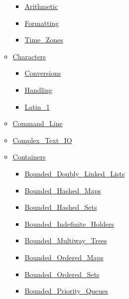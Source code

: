 \begin{scriptsize}
\begin{multicols*}{\columnnr}
\begin{itemize}[leftmargin=0mm]
\begin{itemize}[leftmargin=5mm]
	\begin{itemize}[leftmargin=5mm]
	\item[] \href{http://www.ada-auth.org/standards/22rm/html/RM-9-6-1.html}{Arithmetic}
	\item[] \href{http://www.ada-auth.org/standards/22rm/html/RM-9-6-1.html}{Formatting}
	\item[] \href{http://www.ada-auth.org/standards/22rm/html/RM-9-6-1.html}{Time\_Zones}
	\end{itemize}
  \item[] \href{http://www.ada-auth.org/standards/22rm/html/RM-A-3-1.html}{Characters}
	\begin{itemize}[leftmargin=5mm]
	\item[] \href{http://www.ada-auth.org/standards/22rm/html/RM-A-3-4.html}{Conversions}
	\item[] \href{http://www.ada-auth.org/standards/22rm/html/RM-A-3-2.html}{Handling}
	\item[] \href{http://www.ada-auth.org/standards/22rm/html/RM-A-3-3.html}{Latin\_1}
	\end{itemize}
  \item[] \href{http://www.ada-auth.org/standards/22rm/html/RM-A-15.html}{Command\_Line}
  \item[] \href{http://www.ada-auth.org/standards/22rm/html/RM-G-1-3.html}{Complex\_Text\_IO}
  \item[] \href{http://www.ada-auth.org/standards/22rm/html/RM-A-18-1.html}{Containers}
	\begin{itemize}[leftmargin=5mm]
	\item[] \href{http://www.ada-auth.org/standards/22rm/html/RM-A-18-20.html}{Bounded\_Doubly\_Linked\_Lists}
	\item[] \href{http://www.ada-auth.org/standards/22rm/html/RM-A-18-21.html}{Bounded\_Hashed\_Maps}
	\item[] \href{http://www.ada-auth.org/standards/22rm/html/RM-A-18-23.html}{Bounded\_Hashed\_Sets}
	\item[] \href{http://www.ada-auth.org/standards/22rm/html/RM-A-18-32.html}{Bounded\_Indefinite\_Holders}
	\item[] \href{http://www.ada-auth.org/standards/22rm/html/RM-A-18-25.html}{Bounded\_Multiway\_Trees}
	\item[] \href{http://www.ada-auth.org/standards/22rm/html/RM-A-18-22.html}{Bounded\_Ordered\_Maps}
	\item[] \href{http://www.ada-auth.org/standards/22rm/html/RM-A-18-24.html}{Bounded\_Ordered\_Sets}
	\item[] \href{http://www.ada-auth.org/standards/22rm/html/RM-A-18-31.html}{Bounded\_Priority\_Queues}

\end{itemize}
\end{itemize}
\end{itemize}
\end{multicols*}
\end{scriptsize}

